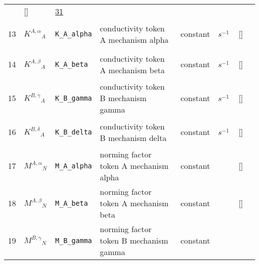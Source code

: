 \begin{longtable}{|p{1cm}|p{3cm}|p{3cm}|p{7cm}|p{3.0cm}|p{3cm}|p{2cm}|p{1cm}|}
             & []
             & \hyperlink{"e:31"}{ 31 }
                 \\
    13
             & \hypertarget{"v:13"}{ $ {{K^{A,\alpha}}}{_{A}} $}
             & \verb|K_A_alpha|
             & conductivity token A mechanism alpha 
             & \begin{lay}constant \end{lay}
             & $ s^{-1} \, $
             & []
             & \\
    14
             & \hypertarget{"v:14"}{ $ {{K^{A,\beta}}}{_{A}} $}
             & \verb|K_A_beta|
             & conductivity token A mechanism beta
             & \begin{lay}constant \end{lay}
             & $ s^{-1} \, $
             & []
             & \\
    15
             & \hypertarget{"v:15"}{ $ {{K^{B,\gamma}}}{_{A}} $}
             & \verb|K_B_gamma|
             & conductivity token B mechanism gamma
             & \begin{lay}constant \end{lay}
             & $ s^{-1} \, $
             & []
             & \\
    16
             & \hypertarget{"v:16"}{ $ {{K^{B,\delta}}}{_{A}} $}
             & \verb|K_B_delta|
             & conductivity token B mechanism delta
             & \begin{lay}constant \end{lay}
             & $ s^{-1} \, $
             & []
             & \\
    17
             & \hypertarget{"v:17"}{ $ {{M^{A,\alpha}}}{_{N}} $}
             & \verb|M_A_alpha|
             & norming factor token A mechanism alpha
             & \begin{lay}constant \end{lay}
             & $  $
             & []
             & \\
    18
             & \hypertarget{"v:18"}{ $ {{M^{A,\beta}}}{_{N}} $}
             & \verb|M_A_beta|
             & norming factor token A mechanism beta
             & \begin{lay}constant \end{lay}
             & $  $
             & []
             & \\
    19
             & \hypertarget{"v:19"}{ $ {{M^{B,\gamma}}}{_{N}} $}
             & \verb|M_B_gamma|
             & norming factor token B mechanism gamma
             & \begin{lay}constant \end{lay}

\end{longtable}
